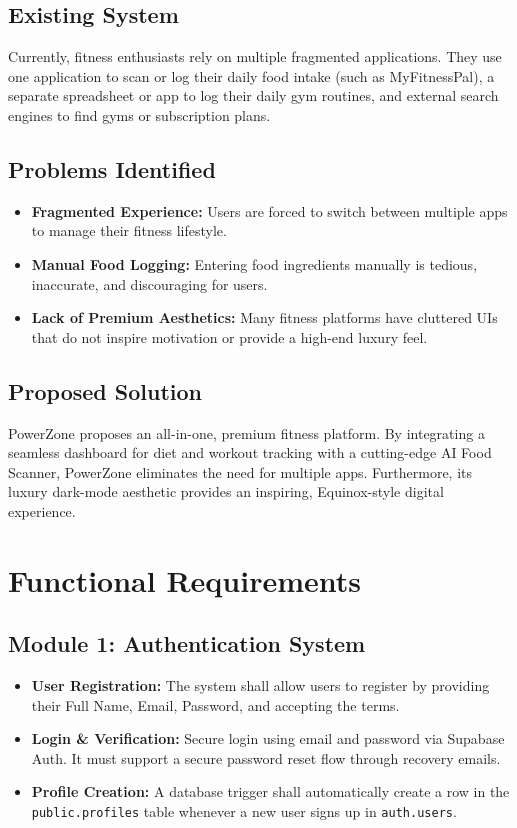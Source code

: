 \documentclass[12pt,a4paper]{article}
\begin{document}
\subsection{Existing System}
Currently, fitness enthusiasts rely on multiple fragmented applications. They use one application to scan or log their daily food intake (such as MyFitnessPal), a separate spreadsheet or app to log their daily gym routines, and external search engines to find gyms or subscription plans. 

\subsection{Problems Identified}
\begin{itemize}
    \item \textbf{Fragmented Experience:} Users are forced to switch between multiple apps to manage their fitness lifestyle.
    \item \textbf{Manual Food Logging:} Entering food ingredients manually is tedious, inaccurate, and discouraging for users.
    \item \textbf{Lack of Premium Aesthetics:} Many fitness platforms have cluttered UIs that do not inspire motivation or provide a high-end luxury feel.
\end{itemize}

\subsection{Proposed Solution}
PowerZone proposes an all-in-one, premium fitness platform. By integrating a seamless dashboard for diet and workout tracking with a cutting-edge AI Food Scanner, PowerZone eliminates the need for multiple apps. Furthermore, its luxury dark-mode aesthetic provides an inspiring, Equinox-style digital experience.

\section{Functional Requirements}

\subsection{Module 1: Authentication System}
\begin{itemize}
    \item \textbf{User Registration:} The system shall allow users to register by providing their Full Name, Email, Password, and accepting the terms.
    \item \textbf{Login \& Verification:} Secure login using email and password via Supabase Auth. It must support a secure password reset flow through recovery emails.
    \item \textbf{Profile Creation:} A database trigger shall automatically create a row in the \texttt{public.profiles} table whenever a new user signs up in \texttt{auth.users}.
\end{itemize}
\end{document}
